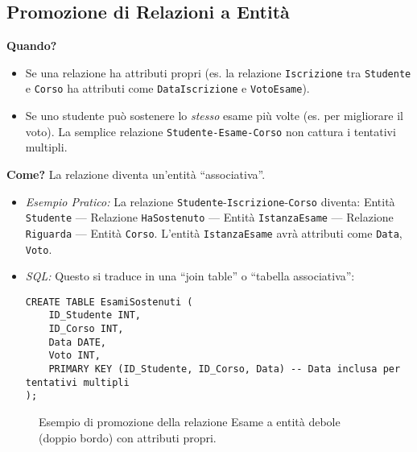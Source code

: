 \documentclass{article}
\begin{document}
	\subsection{Promozione di Relazioni a Entità}
	\textbf{Quando?}
	\begin{itemize}
		\item Se una relazione ha attributi propri (es. la relazione \texttt{Iscrizione} tra \texttt{Studente} e \texttt{Corso} ha attributi come \texttt{DataIscrizione} e \texttt{VotoEsame}).
		\item Se uno studente può sostenere lo \textit{stesso} esame più volte (es. per migliorare il voto). La semplice relazione \texttt{Studente-Esame-Corso} non cattura i tentativi multipli.
	\end{itemize}
	\textbf{Come?} La relazione diventa un'entità ``associativa''.
	\begin{itemize}
		\item \textit{Esempio Pratico:} La relazione \texttt{Studente}-\texttt{Iscrizione}-\texttt{Corso} diventa: Entità \texttt{Studente} --- Relazione \texttt{HaSostenuto} --- Entità \texttt{IstanzaEsame} --- Relazione \texttt{Riguarda} --- Entità \texttt{Corso}. L'entità \texttt{IstanzaEsame} avrà attributi come \texttt{Data}, \texttt{Voto}.
		\item \textit{SQL:} Questo si traduce in una ``join table'' o ``tabella associativa'':
		\begin{verbatim}
CREATE TABLE EsamiSostenuti (
	ID_Studente INT,
	ID_Corso INT,
	Data DATE,
	Voto INT,
	PRIMARY KEY (ID_Studente, ID_Corso, Data) -- Data inclusa per tentativi multipli
);
		\end{verbatim}
	\end{itemize}

	\begin{figure}[h]
		\centering
		\caption{Esempio di promozione della relazione Esame a entità debole (doppio bordo) con attributi propri.}
	\end{figure}
	
\end{document}
